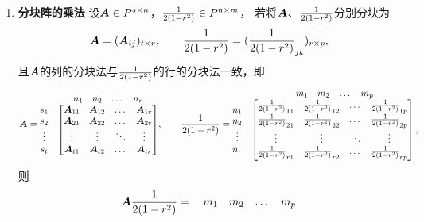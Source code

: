 \begin{theorem}
\begin{enumerate}
\item {\bf 分块阵的乘法}
设\(\boldsymbol{A} \in P^{s \times n}\)，\(\frac{1}{2(1-r^2)} \in P^{n \times m}\)，
若将\(\boldsymbol{A}\)、\(\frac{1}{2(1-r^2)}\)分别分块为
\[
    \boldsymbol{A}=(\boldsymbol{A}_{ij})_{t \times r}, \qquad
    \frac{1}{2(1-r^2)}=(\frac{1}{2(1-r^2)}_{jk})_{r \times p},
\]
且\(\boldsymbol{A}\)的列的分块法与\(\frac{1}{2(1-r^2)}\)的行的分块法一致，即
\begin{align*}
    \boldsymbol{A} = \begin{matrix}
        & \begin{matrix} n_1 & n_2 & \dots & n_r \end{matrix} \\
        \begin{matrix} s_1 \\ s_2 \\ \vdots \\ s_t \end{matrix} & \begin{bmatrix}
        \boldsymbol{A}_{11} & \boldsymbol{A}_{12} & \dots & \boldsymbol{A}_{1r} \\
        \boldsymbol{A}_{21} & \boldsymbol{A}_{22} & \dots & \boldsymbol{A}_{2r} \\
        \vdots & \vdots & \ddots & \vdots \\
        \boldsymbol{A}_{t1} & \boldsymbol{A}_{t2} & \dots & \boldsymbol{A}_{tr}
        \end{bmatrix}
    \end{matrix}
    ,\qquad
    \frac{1}{2(1-r^2)} = \begin{matrix}
        & \begin{matrix} m_1 & m_2 & \dots & m_p \end{matrix} \\
        \begin{matrix} n_1 \\ n_2 \\ \vdots \\ n_r \end{matrix} & \begin{bmatrix}
        \frac{1}{2(1-r^2)}_{11} & \frac{1}{2(1-r^2)}_{12} & \dots & \frac{1}{2(1-r^2)}_{1p} \\
        \frac{1}{2(1-r^2)}_{21} & \frac{1}{2(1-r^2)}_{22} & \dots & \frac{1}{2(1-r^2)}_{2p} \\
        \vdots & \vdots & \ddots & \vdots \\
        \frac{1}{2(1-r^2)}_{r1} & \frac{1}{2(1-r^2)}_{r2} & \dots & \frac{1}{2(1-r^2)}_{rp}
        \end{bmatrix},
    \end{matrix}
\end{align*}
则
\begin{align*}
    \boldsymbol{A}\frac{1}{2(1-r^2)} = \begin{matrix}
        & \begin{matrix} m_1 & m_2 & \dots & m_p \end{matrix} \\

\end{matrix}
\end{align*}
\end{enumerate}
\end{theorem}
